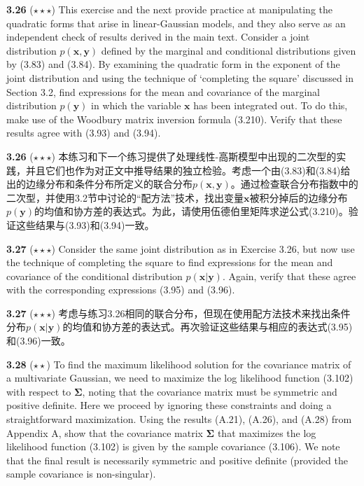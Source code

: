 \documentclass{article}
\begin{document}
\textbf{3.26} ($\star\star\star$) This exercise and the next provide practice at manipulating the quadratic forms that arise in linear-Gaussian models, and they also serve as an independent check of results derived in the main text. Consider a joint distribution $p(\mathbf{x}, \mathbf{y})$ defined by the marginal and conditional distributions given by (3.83) and (3.84). By examining the quadratic form in the exponent of the joint distribution and using the technique of `completing the square' discussed in Section 3.2, find expressions for the mean and covariance of the marginal distribution $p(\mathbf{y})$ in which the variable $\mathbf{x}$ has been integrated out. To do this, make use of the Woodbury matrix inversion formula (3.210). Verify that these results agree with (3.93) and (3.94).

\textbf{3.26} ($\star\star\star$) 本练习和下一个练习提供了处理线性-高斯模型中出现的二次型的实践，并且它们也作为对正文中推导结果的独立检验。考虑一个由(3.83)和(3.84)给出的边缘分布和条件分布所定义的联合分布$p(\mathbf{x}, \mathbf{y})$。通过检查联合分布指数中的二次型，并使用3.2节中讨论的“配方法”技术，找出变量$\mathbf{x}$被积分掉后的边缘分布$p(\mathbf{y})$的均值和协方差的表达式。为此，请使用伍德伯里矩阵求逆公式(3.210)。验证这些结果与(3.93)和(3.94)一致。

\textbf{3.27} ($\star\star\star$) Consider the same joint distribution as in Exercise 3.26, but now use the technique of completing the square to find expressions for the mean and covariance of the conditional distribution $p(\mathbf{x}|\mathbf{y})$. Again, verify that these agree with the corresponding expressions (3.95) and (3.96).

\textbf{3.27} ($\star\star\star$) 考虑与练习3.26相同的联合分布，但现在使用配方法技术来找出条件分布$p(\mathbf{x}|\mathbf{y})$的均值和协方差的表达式。再次验证这些结果与相应的表达式(3.95)和(3.96)一致。

\textbf{3.28} ($\star\star$) To find the maximum likelihood solution for the covariance matrix of a multivariate Gaussian, we need to maximize the log likelihood function (3.102) with respect to $\boldsymbol{\Sigma}$, noting that the covariance matrix must be symmetric and positive definite. Here we proceed by ignoring these constraints and doing a straightforward maximization. Using the results (A.21), (A.26), and (A.28) from Appendix A, show that the covariance matrix $\boldsymbol{\Sigma}$ that maximizes the log likelihood function (3.102) is given by the sample covariance (3.106). We note that the final result is necessarily symmetric and positive definite (provided the sample covariance is non-singular).
\end{document}
